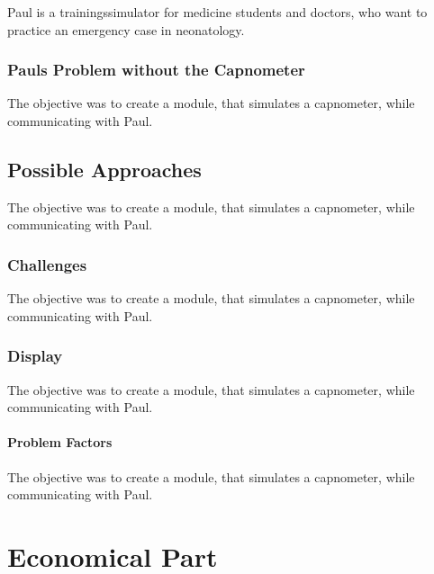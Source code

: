 \documentclass[12pt]{article}
\begin{document}
Paul is a trainingssimulator for medicine students and doctors, who want to practice
an emergency case in neonatology.


\subsubsection{Pauls Problem without the Capnometer}

The objective was to create a module, that simulates a capnometer, while communicating
with Paul.


\subsection{Possible Approaches}

The objective was to create a module, that simulates a capnometer, while communicating
with Paul.


\subsubsection{Challenges}

The objective was to create a module, that simulates a capnometer, while communicating
with Paul.


\subsubsection{Display}

The objective was to create a module, that simulates a capnometer, while communicating
with Paul.


\paragraph{Problem Factors}

The objective was to create a module, that simulates a capnometer, while communicating
with Paul.


\clearpage



\section{Economical Part}
\end{document}
